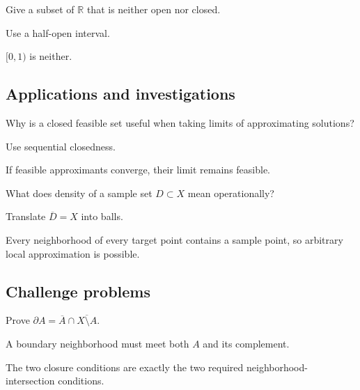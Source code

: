 \begin{exercise}\label{exr:ii04-expand-12}
Give a subset of \(\mathbb R\) that is neither open nor closed.
\end{exercise}
\begin{hint}
Use a half-open interval.
\end{hint}
\begin{solution}
\([0,1)\) is neither.
\end{solution}

\subsection*{Applications and investigations}

\begin{exercise}\label{exr:ii04-expand-13}
Why is a closed feasible set useful when taking limits of approximating solutions?
\end{exercise}
\begin{hint}
Use sequential closedness.
\end{hint}
\begin{solution}
If feasible approximants converge, their limit remains feasible.
\end{solution}

\begin{exercise}\label{exr:ii04-expand-14}
What does density of a sample set \(D\subset X\) mean operationally?
\end{exercise}
\begin{hint}
Translate \(\overline D=X\) into balls.
\end{hint}
\begin{solution}
Every neighborhood of every target point contains a sample point, so arbitrary local approximation is possible.
\end{solution}

\subsection*{Challenge problems}

\begin{exercise}\label{exr:ii04-expand-15}
Prove \(\partial A=\overline A\cap\overline{X\setminus A}\).
\end{exercise}
\begin{hint}
A boundary neighborhood must meet both \(A\) and its complement.
\end{hint}
\begin{solution}
The two closure conditions are exactly the two required neighborhood-intersection conditions.
\end{solution}

